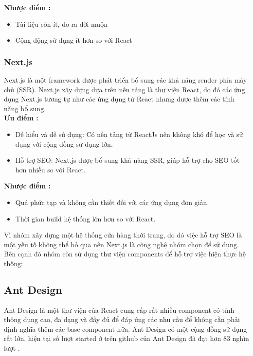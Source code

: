 \textbf{Nhược điểm \cite{technologyFE}:}
\begin{itemize}
    \item Tài liệu còn ít, do ra đời muộn
    \item Cộng động sử dụng ít hơn so với React
\end{itemize}

\subsubsection{Next.js}

\hspace*{0.5cm} Next.js là một framework được phát triển bổ sung các khả năng render phía máy chủ (SSR). Next.js xây dựng dựa trên nền tảng là thư viện React, do đó các ứng dụng Next.js tương tự như các ứng dụng từ React nhưng được thêm các tính năng bổ sung.\\


\textbf{Ưu điểm \cite{technologyNextAdvance}:}
\begin{itemize}
    \item Dễ hiểu và dễ sử dụng: Có nền tảng từ ReactJs nên không khó để học và sử dụng với cộng đồng sử dụng lớn.
    \item Hỗ trợ SEO: Next.js được bổ sung khả năng SSR, giúp hỗ trợ cho SEO tốt hơn nhiều so với React.
\end{itemize}

\textbf{Nhược điểm \cite{technologyNextAdvance}:}
\begin{itemize}
    \item Quá phức tạp và không cần thiết đối với các ứng dụng đơn giản.
    \item Thời gian build hệ thống lớn hơn so với React.
\end{itemize}

Vì nhóm xây dựng một hệ thống cửa hàng thời trang, do đó việc hỗ trợ SEO là một yếu tố không thể bỏ qua nên Next.js là công nghệ nhóm chọn để sử dụng. \\

Bên cạnh đó nhóm còn sử dụng thư viện components để hỗ trợ việc hiện thực hệ thống:

\subsection*{Ant Design}

\hspace*{0.5cm} Ant Design là một thư viện của React cung cấp rất nhiều component có tính thông dụng cao, đa dạng và đầy đủ để đáp ứng các nhu cầu để không cần phải định nghĩa thêm các base component nữa. Ant Design có một cộng đồng sử dụng rất lớn, hiện tại số lượt started ở trên github của Ant Design đã đạt hơn 83 nghìn lượt \cite{technologyAntdStar}.



